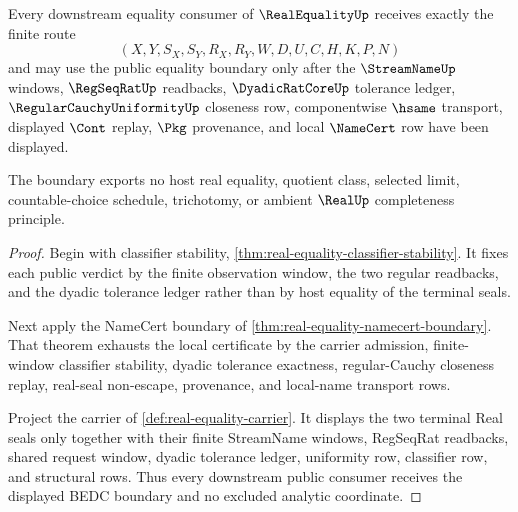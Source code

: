 \begin{theorem}
\label{thm:real-equality-public-boundary}
Every downstream equality consumer of $\RealEqualityUp$ receives exactly the finite route
$$
(X,Y,S_X,S_Y,R_X,R_Y,W,D,U,C,H,K,P,N)
$$
and may use the public equality boundary only after the $\StreamNameUp$ windows, $\RegSeqRatUp$ readbacks, $\DyadicRatCoreUp$ tolerance ledger, $\RegularCauchyUniformityUp$ closeness row, componentwise $\hsame$ transport, displayed $\Cont$ replay, $\Pkg$ provenance, and local $\NameCert$ row have been displayed.

The boundary exports no host real equality, quotient class, selected limit, countable-choice schedule, trichotomy, or ambient $\RealUp$ completeness principle.
\end{theorem}
\begin{proof}
Begin with classifier stability, \autoref{thm:real-equality-classifier-stability}. It fixes each public verdict by the finite observation window, the two regular readbacks, and the dyadic tolerance ledger rather than by host equality of the terminal seals.

Next apply the NameCert boundary of \autoref{thm:real-equality-namecert-boundary}. That theorem exhausts the local certificate by the carrier admission, finite-window classifier stability, dyadic tolerance exactness, regular-Cauchy closeness replay, real-seal non-escape, provenance, and local-name transport rows.

Project the carrier of \autoref{def:real-equality-carrier}. It displays the two terminal Real seals only together with their finite StreamName windows, RegSeqRat readbacks, shared request window, dyadic tolerance ledger, uniformity row, classifier row, and structural rows. Thus every downstream public consumer receives the displayed BEDC boundary and no excluded analytic coordinate.
\end{proof}


